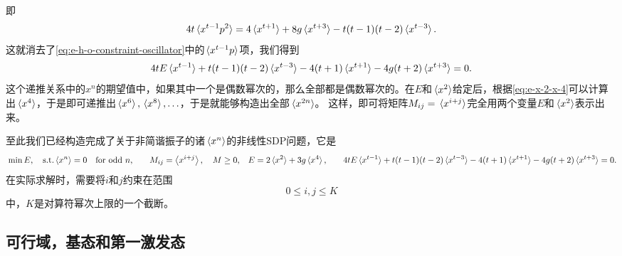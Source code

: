 \documentclass[oneside]{fduthesis}
\def\\{}%
\begin{document}
即
\begin{equation}
    4 t \expval*{x^{t-1} p^2} = 4 \expval*{x^{t+1}} + 8 g \expval*{x^{t+3}} - t(t-1)(t-2) \expval*{x^{t-3}}.
\end{equation}
这就消去了\eqref{eq:e-h-o-constraint-oscillator}中的$\expval*{x^{t-1} p}$项，我们得到
\begin{equation}
    4 t E \expval*{x^{t-1}} + t(t-1)(t-2) \expval*{x^{t-3}} - 4 (t+1) \expval*{x^{t+1}} - 4g(t+2) \expval*{x^{t+3}} = 0.
    \label{eq:recursive-nonlinear-sdp-relation}
\end{equation}
这个递推关系中的$x^n$的期望值中，如果其中一个是偶数幂次的，那么全部都是偶数幂次的。在$E$和$\expval*{x^2}$给定后，根据\eqref{eq:e-x-2-x-4}可以计算出$\expval*{x^4}$，于是即可递推出$\expval*{x^6}, \expval*{x^8}, \ldots$，于是就能够构造出全部$\expval*{x^{2n}}$。
这样，即可将矩阵$M_{ij} = \expval*{x^{i+j}}$完全用两个变量$E$和$\expval*{x^2}$表示出来。

至此我们已经构造完成了关于非简谐振子的诸$\expval*{x^n}$的非线性SDP问题，它是
\begin{equation}
    \begin{aligned}
        &\min E, \quad \text{s.t.} \expval*{x^n} = 0 \quad \text{for odd $n$}, \\
        &\quad M_{ij} = \expval{x^{i + j}}, \quad M \geq 0, \\
        &\quad E = 2 \expval*{x^2} + 3 g \expval*{x^4} , \\
        &\quad 4 t E \expval*{x^{t-1}} + t(t-1)(t-2) \expval*{x^{t-3}} - 4 (t+1) \expval*{x^{t+1}} - 4g(t+2) \expval*{x^{t+3}} = 0.
    \end{aligned}
    \label{eq:nonlinear-sdp-problem}
\end{equation}
在实际求解时，需要将$i$和$j$约束在范围
\begin{equation}
    0 \leq i, j \leq K
\end{equation}
中，$K$是对算符幂次上限的一个截断。

\subsection{可行域，基态和第一激发态}
\end{document}
